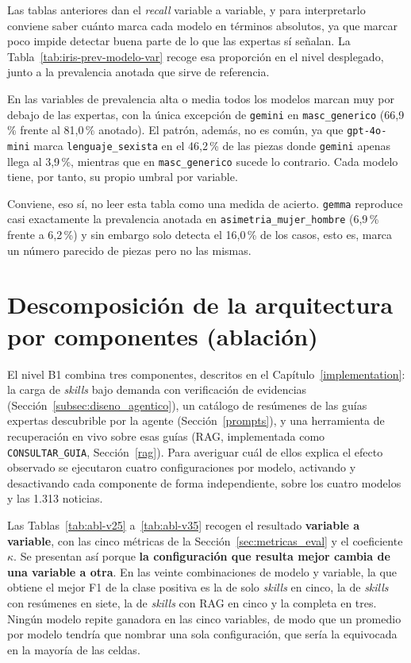 Las tablas anteriores dan el \textit{recall} variable a variable, y para interpretarlo conviene
saber cuánto marca cada modelo en términos absolutos, ya que marcar poco impide
detectar buena parte de lo que las expertas sí señalan. La
Tabla~\ref{tab:iris-prev-modelo-var} recoge esa proporción en el nivel desplegado,
junto a la prevalencia anotada que sirve de referencia.



En las variables de prevalencia alta o media todos los modelos marcan muy por debajo de
las expertas, con la única excepción de \texttt{gemini} en \texttt{masc\_generico}
(66,9\,\% frente al 81,0\,\% anotado). El patrón, además, no es común, ya que
\texttt{gpt-4o-mini} marca \texttt{lenguaje\_sexista} en el 46,2\,\% de las piezas
donde \texttt{gemini} apenas llega al 3,9\,\%, mientras que en \texttt{masc\_generico}
sucede lo contrario. Cada modelo tiene, por tanto, su propio umbral por variable.

Conviene, eso sí, no leer esta tabla como una medida de acierto. \texttt{gemma}
reproduce casi exactamente la prevalencia anotada en
\texttt{asimetria\_mujer\_hombre} (6,9\,\% frente a 6,2\,\%) y sin embargo solo detecta
el 16,0\,\% de los casos, esto es, marca un número parecido de piezas pero no las
mismas.

\section{Descomposición de la arquitectura por componentes (ablación)}
\label{subsec:iris_descomposicion}

El nivel B1 combina tres componentes, descritos en el Capítulo~\ref{implementation}:
la carga de \textit{skills} bajo demanda con verificación de evidencias
(Sección~\ref{subsec:diseno_agentico}), un catálogo de resúmenes de las guías
expertas descubrible por la agente (Sección~\ref{prompts}), y una herramienta de
recuperación en vivo sobre esas guías (RAG, implementada como \texttt{CONSULTAR\_GUIA},
Sección~\ref{rag}). Para averiguar cuál de ellos explica el efecto observado se
ejecutaron cuatro configuraciones por modelo, activando y desactivando cada
componente de forma independiente, sobre los cuatro modelos y las 1.313 noticias.

Las Tablas~\ref{tab:abl-v25} a~\ref{tab:abl-v35} recogen el resultado
\textbf{variable a variable}, con las cinco métricas de la
Sección~\ref{sec:metricas_eval} y el coeficiente $\kappa$. Se presentan así porque
\textbf{la configuración que resulta mejor cambia de una variable a otra}. En las
veinte combinaciones de modelo y variable, la que obtiene el mejor F1 de la clase
positiva es la de solo \textit{skills} en cinco, la de \textit{skills} con resúmenes
en siete, la de \textit{skills} con RAG en cinco y la completa en tres. Ningún modelo
repite ganadora en las cinco variables, de modo que un promedio por modelo tendría que
nombrar una sola configuración, que sería la equivocada en la mayoría de las celdas.

